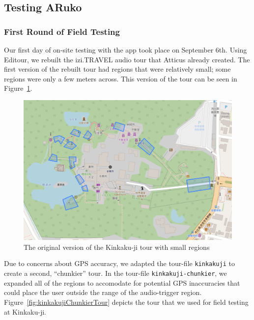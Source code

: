 \documentclass[a4paper, 10pt, american, titlepage]{article}
\begin{document}
\subsection{Testing ARuko}
\label{sec:testingARuko}

\subsubsection{First Round of Field Testing}
\label{sec:firstRoundOfFieldTesting}

Our first day of on-site testing with the app took place on September 6th.
Using Editour, we rebuilt the izi.TRAVEL audio tour that Atticus already
created. The first version of the rebuilt tour had regions that were relatively
small; some regions were only a few meters across. This version of the tour can
be seen in Figure~\ref{fig:kinkakujiTour}.

\begin{figure}[h]
	\centering
	\includegraphics[width=\textwidth]{kinkakuji-tour.png}
	\caption[The original version of the Kinkaku-ji tour]{The original version
		of the Kinkaku-ji tour with small regions}
	\label{fig:kinkakujiTour}
\end{figure}

Due to concerns about GPS accuracy, we adapted the tour-file \texttt{kinkakuji}
to create a second, ``chunkier'' tour.  In the tour-file
\texttt{kinkakuji-chunkier}, we expanded all of the regions to accomodate for
potential GPS inaccuracies that could place the user outside the range of the
audio-trigger region.  Figure~\ref{fig:kinkakujiChunkierTour} depicts the tour
that we used for field testing at Kinkaku-ji.
\end{document}
